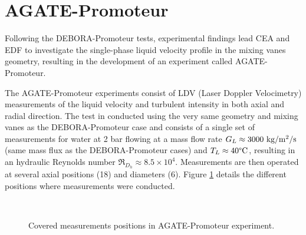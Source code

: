 \section{AGATE-Promoteur}
\label{sec:agate_prom_desc}

Following the DEBORA-Promoteur tests, experimental findings lead CEA and EDF to investigate the single-phase liquid velocity profile in the mixing vanes geometry, resulting in the development of an experiment called AGATE-Promoteur.

\npar

The AGATE-Promoteur experiments consist of LDV (Laser Doppler Velocimetry) measurements of the liquid velocity and turbulent intensity in both axial and radial direction. The test in conducted using the very same geometry and mixing vanes as the DEBORA-Promoteur case and consists of a single set of measurements for water at 2 bar flowing at a mass flow rate $G_{L} \approx 3000\ \text{kg/m$^{2}$/s}$ (same mass flux as the DEBORA-Promoteur cases) and $T_{L} \approx 40\degree\mathrm{C}$, resulting in an hydraulic Reynolds number $\Re_{D_{h}} \approx 8.5\times 10^{4}$. Measurements are then operated at several axial positions (18) and diameters (6). Figure \ref{fig:agate_mes} details the different positions where measurements were conducted.




\begin{figure}[!h]
\centering
{}
\\
\caption{Covered measurements positions in AGATE-Promoteur experiment.}
\label{fig:agate_mes}
\end{figure}


